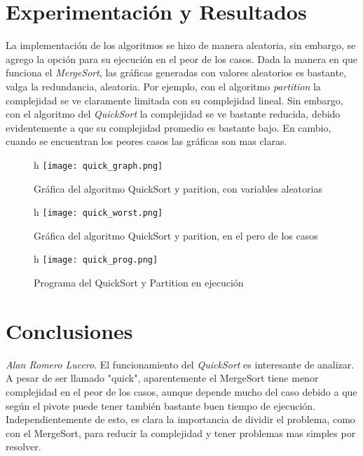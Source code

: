 \documentclass[12pt,twoside]{article}
\begin{document}
\section{Experimentaci\'on y Resultados}
La implementaci\'on de los algoritmos se hizo de manera aleatoria, sin embargo, se agrego la opci\'on para su ejecuci\'on en el peor de los casos. Dada la manera en que funciona el \textit{MergeSort}, las gr\'aficas generadas con valores aleatorios es bastante, valga la redundancia, aleatoria. Por ejemplo, con el algoritmo \textit{partition} la complejidad se ve claramente limitada con su complejidad lineal. Sin embargo, con el algoritmo del \textit{QuickSort} la complejidad se ve bastante reducida, debido evidentemente a que su complejidad promedio es bastante bajo.
En cambio, cuando se encuentran los peores casos las gr\'aficas son mas claras.

\begin{figure}{h}
    \centering
    \texttt{[image: quick\_graph.png]}
    \caption{Gr\'afica del algoritmo QuickSort y parition, con variables aleatorias }
    \label{fig:quick_graph}
\end{figure}

\begin{figure}{h}
    \centering
    \texttt{[image: quick\_worst.png]}
    \caption{Gr\'afica del algoritmo QuickSort y parition, en el pero de los casos }
    \label{fig:quick_worst}
\end{figure}

\begin{figure}{h}
    \centering
    \texttt{[image: quick\_prog.png]}
    \caption{Programa del QuickSort y Partition en ejecuci\'on}
    \label{fig:quick_program}
\end{figure}


\section{Conclusiones}

\textit{Alan Romero Lucero}. El funcionamiento del \textit{QuickSort} es interesante de analizar. A pesar de ser llamado "quick", aparentemente el MergeSort tiene menor complejidad en el peor de los casos, aunque depende mucho del caso debido a que seg\'un el pivote puede tener tambi\'en bastante buen tiempo de ejecuci\'on. Independientemente de esto, es clara la importancia de dividir el problema, como con el MergeSort, para reducir la complejidad y tener problemas mas simples por resolver.
\end{document}
